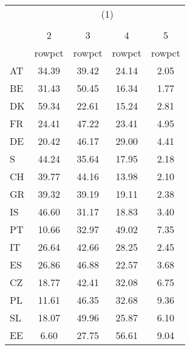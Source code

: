 {
\def\sym#1{\ifmmode^{#1}\else\(^{#1}\)\fi}
\begin{tabular}{l*{4}{c}}
\hline\hline
            &\multicolumn{4}{c}{(1)}                            \\
            &\multicolumn{4}{c}{}                               \\
            &           2&           3&           4&           5\\
            &      rowpct&      rowpct&      rowpct&      rowpct\\
\hline
AT          &       34.39&       39.42&       24.14&        2.05\\
BE          &       31.43&       50.45&       16.34&        1.77\\
DK          &       59.34&       22.61&       15.24&        2.81\\
FR          &       24.41&       47.22&       23.41&        4.95\\
DE          &       20.42&       46.17&       29.00&        4.41\\
S           &       44.24&       35.64&       17.95&        2.18\\
CH          &       39.77&       44.16&       13.98&        2.10\\
GR          &       39.32&       39.19&       19.11&        2.38\\
IS          &       46.60&       31.17&       18.83&        3.40\\
PT          &       10.66&       32.97&       49.02&        7.35\\
IT          &       26.64&       42.66&       28.25&        2.45\\
ES          &       26.86&       46.88&       22.57&        3.68\\
CZ          &       18.77&       42.41&       32.08&        6.75\\
PL          &       11.61&       46.35&       32.68&        9.36\\
SL          &       18.07&       49.96&       25.87&        6.10\\
EE          &        6.60&       27.75&       56.61&        9.04\\
\hline\hline
\end{tabular}
}
